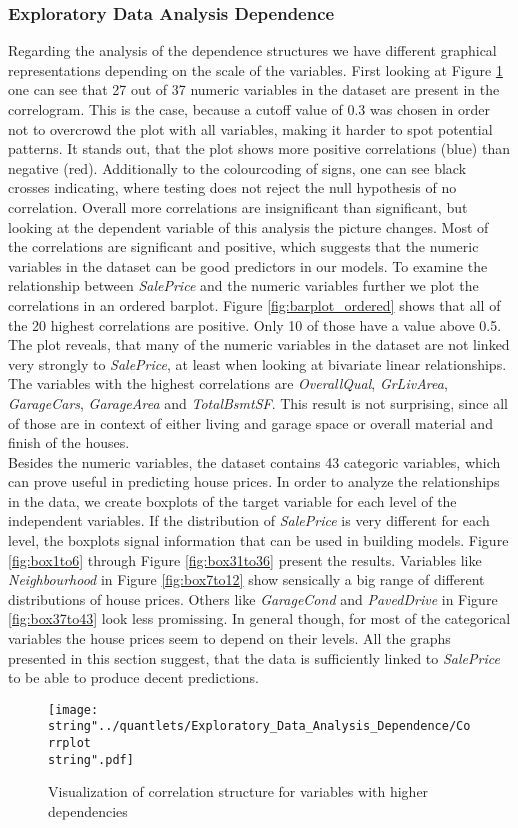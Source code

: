 \subsubsection{Exploratory Data Analysis Dependence}
Regarding the analysis of the dependence structures we have different graphical representations depending on the scale of the variables. First looking at Figure \ref{fig:corrgram} one can see that 27 out of 37 numeric variables in the dataset are present in the correlogram. This is the case, because a cutoff value of 0.3 was chosen in order not to overcrowd the plot with all variables, making it harder to spot potential patterns. It stands out, that the plot shows more positive correlations (blue) than negative (red). Additionally to the colourcoding of signs, one can see black crosses indicating, where testing does not reject the null hypothesis of no correlation. Overall more correlations are insignificant than significant, but looking at the dependent variable of this analysis the picture changes. Most of the correlations are significant and positive, which suggests that the numeric variables in the dataset can be good predictors in our models. To examine the relationship between \textit{SalePrice} and the numeric variables further we plot the correlations in an ordered barplot. Figure \ref{fig:barplot_ordered} shows that all of the 20 highest correlations are positive. Only 10 of those have a value above 0.5. The plot reveals, that many of the numeric variables in the dataset are not linked very strongly to \textit{SalePrice}, at least when looking at bivariate linear relationships. The variables with the highest correlations are \textit{OverallQual}, \textit{GrLivArea}, \textit{GarageCars}, \textit{GarageArea} and \textit{TotalBsmtSF}. This result is not surprising, since all of those are in context of either living and garage space or overall material and finish of the houses. \\
Besides the numeric variables, the dataset contains 43 categoric variables, which can prove useful in predicting house prices. In order to analyze the relationships in the data, we create boxplots of the target variable for each level of the independent variables. If the distribution of \textit{SalePrice} is very different for each level, the boxplots signal information that can be used in building models. Figure \ref{fig:box1to6} through Figure \ref{fig:box31to36} present the results. Variables like \textit{Neighbourhood} in Figure \ref{fig:box7to12} show sensically a big range of different  distributions of house prices. Others like \textit{GarageCond} and \textit{PavedDrive} in Figure \ref{fig:box37to43} look less promissing. In general though, for most of the categorical variables the house prices seem to depend on their levels. All the graphs presented in this section suggest, that the data is sufficiently linked to \textit{SalePrice} to be able to produce decent predictions. 
\begin{figure}[H]
  \centering
\texttt{[image: \\string"../quantlets/Exploratory\_Data\_Analysis\_Dependence/Corrplot\\string".pdf]}
  \caption{Visualization of correlation structure for variables with higher dependencies}\label{fig:corrgram}
\end{figure}

